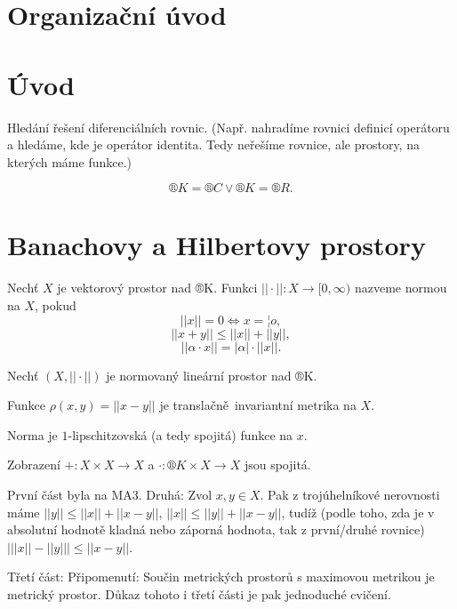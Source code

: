 \documentclass[12pt]{article}					%
\begin{document}

\section*{Organizační úvod}
\section*{Úvod}

\begin{poznamka}[Motivace]
	Hledání řešení diferenciálních rovnic. (Např. nahradíme rovnici definicí operátoru a hledáme, kde je operátor identita. Tedy neřešíme rovnice, ale prostory, na kterých máme funkce.)
\end{poznamka}

\begin{definice}
	$$ ®K = ®C \lor ®K = ®R. $$ 
\end{definice}

\section{Banachovy a Hilbertovy prostory}

\begin{definice}
	Nechť $X$ je vektorový prostor nad ®K. Funkci $||·||: X \rightarrow [0, ∞)$ nazveme normou na $X$, pokud
	$$ || x || = 0 \Leftrightarrow x = ¦o, $$
	$$ || x + y || ≤ || x || + || y ||, $$ 
	$$ || \alpha·x || = | \alpha | · || x | |. $$ 
\end{definice}

\begin{tvrzeni}
	Nechť $\left( X, || · || \right) $ je normovaný lineární prostor nad ®K.
	
	Funkce $\rho\left( x, y  \right) = || x - y ||$ je translačně invariantní metrika na $X$.

	Norma  je $1$-lipschitzovská (a tedy spojitá) funkce na $x$.

	Zobrazení $+: X \times X \rightarrow X$ a $·: ®K \times X \rightarrow X$ jsou spojitá.

	\begin{dukazin}
		První část byla na MA3. Druhá: Zvol $x, y \in X$. Pak z trojúhelníkové nerovnosti máme $||y|| ≤ ||x|| + ||x - y||$, $||x|| ≤ ||y|| + ||x - y||$, tudíž (podle toho, zda je v absolutní hodnotě kladná nebo záporná hodnota, tak z první/druhé rovnice) $\big|||x|| - ||y|| \big| ≤ ||x - y||$.

		Třetí část: Připomenutí: Součin metrických prostorů s maximovou metrikou je metrický prostor. Důkaz tohoto i třetí části je pak jednoduché cvičení.
	\end{dukazin}
\end{tvrzeni}
\end{document}

